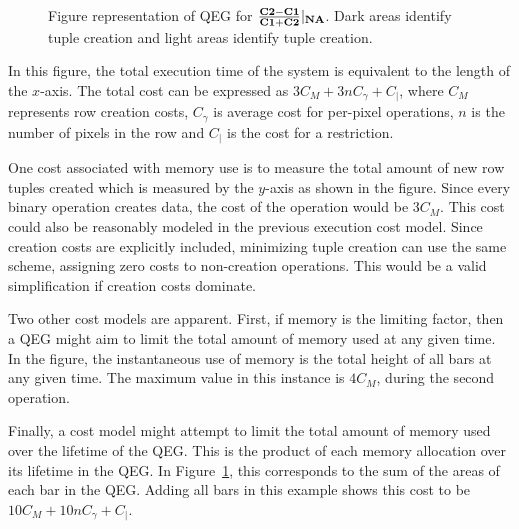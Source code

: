 \documentclass{ucdthesis}       %
\newcommand{\Tb}[2][]{ \TR[#1]{\psframebox{\rule{0pt}{9pt}#2}} }
\begin{document}
\begin{figure}[htb]
  \centering
  \pstree[treemode=U,nodesep=2pt,levelsep=30pt]{\TR{Q}}{
    \pstree[treemode=U]{\Tb{$|_{NA}$}}{
      \pstree[treemode=U]{\Tcircle{$/$}}{
        \pstree[treemode=U]{\Tcircle{$+$}}{
          \TR[name=C1]{\im{C1}}
          \TR[name=IR]{\im{C2}}
        }
        \Tcircle[name=minus]{$-$}
        \ncline{C1}{minus}
        \ncline{IR}{minus}
      }
    }
  }
  \quad
  
  \caption[Figure representation of \ac{QEG} for $\frac{\im{C2}-\im{C1}}{\im{C1}+\im{C2}}|_{\ps{NA}}$]{Figure representation of \ac{QEG} for $\frac{\im{C2}-\im{C1}}{\im{C1}+\im{C2}}|_{\ps{NA}}$.  Dark areas identify tuple creation and light areas identify tuple creation.}
  \label{fig:NDVI-1}
\end{figure}

In this figure, the total execution time of the system is equivalent
to the length of the $x$-axis.  The total cost can be expressed as
$3C_{M} + 3nC_{\gamma} + C_{|}$, where $C_{M}$ represents row creation
costs, $C_{\gamma}$ is average cost for per-pixel operations, $n$ is
the number of pixels in the row and $C_{|}$ is the cost for a
restriction.

One cost associated with memory use is to measure the total amount of
new row tuples created which is measured by the $y$-axis as shown in
the figure.  Since every binary operation creates data, the cost of
the operation would be $3C_{M}$.  This cost could also be reasonably
modeled in the previous execution cost model.  Since creation costs
are explicitly included, minimizing tuple creation can use the same
scheme, assigning zero costs to non-creation operations.  This would
be a valid simplification if creation costs dominate.

Two other cost models are apparent.  First, if memory is the limiting
factor, then a \ac{QEG} might aim to limit the total amount of memory
used at any given time.  In the figure, the instantaneous use of
memory is the total height of all bars at any given time.  The maximum
value in this instance is $4C_{M}$, during the second operation.

Finally, a cost model might attempt to limit the total amount of
memory used over the lifetime of the \ac{QEG}.  This is the product of
each memory allocation over its lifetime in the \ac{QEG}.  In
Figure~\ref{fig:NDVI-1}, this corresponds to the sum of the areas of
each bar in the \ac{QEG}.  Adding all bars in this example shows this
cost to be $10 C_{M} + 10nC_{\gamma} + C_{|}$.
\end{document}
